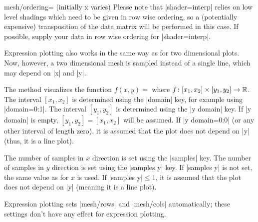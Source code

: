 \begin{pgfplotskey}{mesh/ordering= (initially x varies)}
	Please note that |shader=interp| relies on low level shadings which need to be given in row wise ordering, so a (potentially expensive) transposition of the data matrix will be performed in this case. If possible, supply your data in row wise ordering for |shader=interp|.
\end{pgfplotskey}

\begin{addplot3operation}[]{}{}
\label{cmd:addplot3:expr}
	Expression plotting also works in the same way as for two dimensional plots. Now, however, a two dimensional mesh is sampled instead of a single line, which may depend on |x| and |y|.

	The method   visualizes the function $f(x,y) = $ where $ f \colon [x_1,x_2] \times [y_1,y_2] \to \mathbb{R}$. The interval $[x_1,x_2]$ is determined using the |domain| key, for example using |domain=0:1|. The interval $[y_1,y_2]$ is determined using the |y domain| key. If |y domain| is empty, $[y_1,y_2] = [x_1,x_2]$ will be assumed. If |y domain=0:0| (or any other interval of length zero), it is assumed that the plot does not depend on |y| (thus, it is a line plot).

	The number of samples in $x$ direction is set using the |samples| key. The number of samples in $y$ direction is set using the |samples y| key. If |samples y| is not set, the same value as for $x$ is used. If |samples y|$\le 1$, it is assumed that the plot does not depend on |y| (meaning it is a line plot).

\pgfplotsexpensiveexample
\begin{codeexample}[]
\end{codeexample}

\pgfplotsexpensiveexample
\begin{codeexample}[]
\end{codeexample}

	Expression plotting sets |mesh/rows| and |mesh/cols| automatically; these settings don't have any effect for expression plotting.
\end{addplot3operation}

